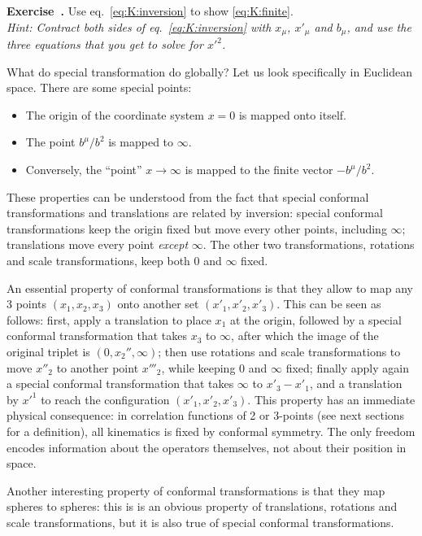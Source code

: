 \documentclass[a4paper,12pt]{article}
\numberwithin{equation}{section}
\newcounter{exercise}[section]
\newenvironment{exercise}[1][]%
	{\refstepcounter{exercise}\bigskip
	\begin{mdframed}[backgroundcolor=gray!20, linewidth=0]
	\noindent\textbf{Exercise~\thesection.\theexercise #1} \rmfamily}
  	{\end{mdframed}\bigskip}
\newcommand\hint[1]{\emph{Hint: #1}}
\begin{document}
\begin{exercise}
	Use eq.~\eqref{eq:K:inversion} to show \eqref{eq:K:finite}.\\
	\hint{Contract both sides of eq.~\eqref{eq:K:inversion} with $x_\mu$, $x'_\mu$ and $b_\mu$, and use the three equations that you get to solve for $x'^2$.}
\end{exercise}

What do special transformation do globally?
Let us look specifically in Euclidean space. There are some special points:
\begin{itemize}

\item
The origin of the coordinate system $x = 0$ is mapped onto itself.

\item
The point $b^\mu / b^2$ is mapped to $\infty$. 

\item
Conversely, the ``point'' $x \to \infty$ is mapped to the finite vector $-b^\mu/b^2$.

\end{itemize}
%
These properties can be understood from the fact that special conformal transformations and translations are related by inversion:
special conformal transformations keep the origin fixed but move every other points, including $\infty$; translations move every point \emph{except} $\infty$. The other two transformations, rotations and scale transformations, keep both $0$ and $\infty$ fixed.


An essential property of conformal transformations is that they allow to map any 3 points $(x_1, x_2, x_3)$ onto another set $( x'_1, x'_2, x'_3)$. This can be seen as follows: first, apply a translation to place $x_1$ at the origin, followed by a special conformal transformation that takes $x_3$ to $\infty$, after which the image of the original triplet is $(0, x_2'', \infty)$; then use rotations and scale transformations to move $x''_2$ to another point $x'''_2$, while keeping $0$ and $\infty$ fixed; finally apply again a special conformal transformation that takes $\infty$ to $x'_3 - x'_1$, and a translation by $x'^1$ to reach the configuration $( x'_1, x'_2, x'_3)$.
This property has an immediate physical consequence: in correlation functions of 2 or 3-points (see next sections for a definition), all kinematics is fixed by conformal symmetry. The only freedom encodes information about the operators themselves, not about their position in space.

Another interesting property of conformal transformations is that they map spheres to spheres: this is is an obvious property of translations, rotations and scale transformations, but it is also true of special conformal transformations. 
\end{document}
